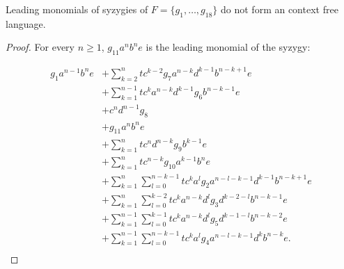 \documentclass[sigconf]{acmart}
\theoremstyle{plain}
\theoremstyle{definition}
\theoremstyle{remark}
\begin{document}
\begin{proposition}
  Leading monomials of syzygies of $F=\{g_1,\dots,g_{18}\}$ do not form an context free language.
  \label{prop:exp_pas_regulier}
\end{proposition}
\begin{proof}
  For every $n \geq 1$, $g_{11}a^nb^ne$ is the leading monomial of the syzygy:

  \begin{align*}
    g_1a^{n-1}b^ne & + \sum_{k = 2}^{n} tc^{k - 2}g_7a^{n - k}d^{k - 1}b^{n - k + 1}e \\
    & + \sum_{k = 1}^{n - 1} tc^ka^{n - k}d^{k - 1}g_6b^{n - k - 1}e \\
    & + c^nd^{n - 1}g_8 \\
    & + g_{11}a^nb^ne \\
    & + \sum_{k = 1}^n tc^nd^{n - k}g_9b^{k - 1}e \\
    & + \sum_{k = 1}^n tc^{n - k}g_{10}a^{k - 1}b^ne \\
    & + \sum_{k = 1}^{n} \sum_{l = 0}^{n - k - 1} tc^{k}a^{l}g_2a^{n - l - k - 1}d^{k - 1}b^{n - k + 1} e \\
    & + \sum_{k = 1}^{n} \sum_{l = 0}^{k - 2} tc^{k}a^{n - k}d^lg_3d^{k - 2 - l}b^{n - k - 1}e \\
    & + \sum_{k = 1}^{n - 1} \sum_{l = 0}^{k - 1} tc^{k}a^{n - k}d^lg_5d^{k - 1 - l}b^{n - k - 2}e \\
    & + \sum_{k = 1}^{n - 1} \sum_{l = 0}^{n - k - 1} tc^{k}a^{l}g_4a^{n - l - k - 1}d^{k}b^{n - k} e. \\
  \end{align*}


\end{proof}
\end{document}
